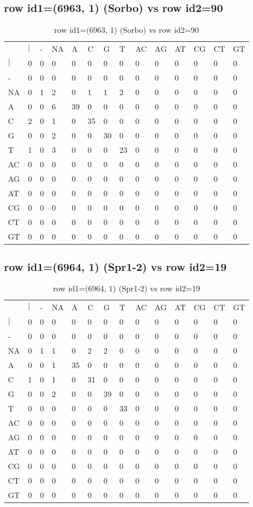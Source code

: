 \subsection{row id1=(6963, 1) (Sorbo) vs row id2=90}
\begin{center}
\begin{longtable}{|l|l|l|l|l|l|l|l|l|l|l|l|l|l|}
\caption{row id1=(6963, 1) (Sorbo) vs row id2=90} \label{table_dm174}\\
\hline
\\
\hline
&$|$&-&NA&A&C&G&T&AC&AG&AT&CG&CT&GT\\
$|$&0&0&0&0&0&0&0&0&0&0&0&0&0\\
-&0&0&0&0&0&0&0&0&0&0&0&0&0\\
NA&0&1&2&0&1&1&2&0&0&0&0&0&0\\
A&0&0&6&39&0&0&0&0&0&0&0&0&0\\
C&2&0&1&0&35&0&0&0&0&0&0&0&0\\
G&0&0&2&0&0&30&0&0&0&0&0&0&0\\
T&1&0&3&0&0&0&23&0&0&0&0&0&0\\
AC&0&0&0&0&0&0&0&0&0&0&0&0&0\\
AG&0&0&0&0&0&0&0&0&0&0&0&0&0\\
AT&0&0&0&0&0&0&0&0&0&0&0&0&0\\
CG&0&0&0&0&0&0&0&0&0&0&0&0&0\\
CT&0&0&0&0&0&0&0&0&0&0&0&0&0\\
GT&0&0&0&0&0&0&0&0&0&0&0&0&0\\
\hline
\end{longtable}
\end{center}

\subsection{row id1=(6964, 1) (Spr1-2) vs row id2=19}
\begin{center}
\begin{longtable}{|l|l|l|l|l|l|l|l|l|l|l|l|l|l|}
\caption{row id1=(6964, 1) (Spr1-2) vs row id2=19} \label{table_dm176}\\
\hline
\\
\hline
&$|$&-&NA&A&C&G&T&AC&AG&AT&CG&CT&GT\\
$|$&0&0&0&0&0&0&0&0&0&0&0&0&0\\
-&0&0&0&0&0&0&0&0&0&0&0&0&0\\
NA&0&1&1&0&2&2&0&0&0&0&0&0&0\\
A&0&0&1&35&0&0&0&0&0&0&0&0&0\\
C&1&0&1&0&31&0&0&0&0&0&0&0&0\\
G&0&0&2&0&0&39&0&0&0&0&0&0&0\\
T&0&0&0&0&0&0&33&0&0&0&0&0&0\\
AC&0&0&0&0&0&0&0&0&0&0&0&0&0\\
AG&0&0&0&0&0&0&0&0&0&0&0&0&0\\
AT&0&0&0&0&0&0&0&0&0&0&0&0&0\\
CG&0&0&0&0&0&0&0&0&0&0&0&0&0\\
CT&0&0&0&0&0&0&0&0&0&0&0&0&0\\
GT&0&0&0&0&0&0&0&0&0&0&0&0&0\\
\hline
\end{longtable}
\end{center}

